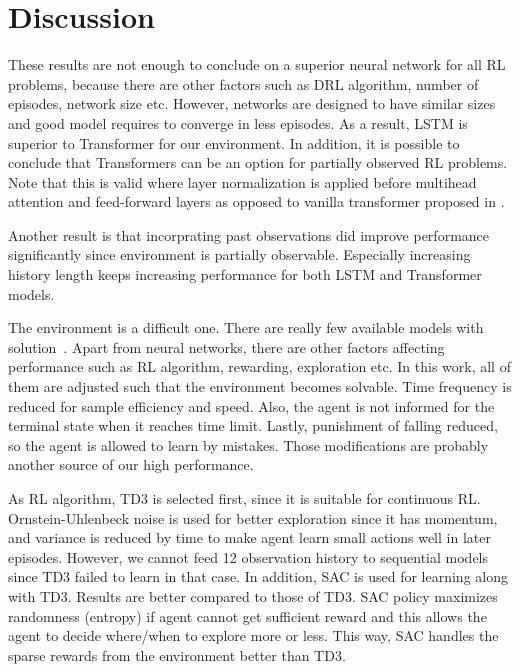 \section{Discussion}
These results are not enough to conclude on a superior neural network for all RL problems, because there are other factors such as DRL algorithm, number of episodes, network size etc. 
However, networks are designed to have similar sizes and good model requires to converge in less episodes. 
As a result, LSTM is superior to Transformer for our environment. 
In addition, it is possible to conclude that Transformers can be an option for partially observed RL problems.
Note that this is valid where layer normalization is applied before multihead attention and feed-forward layers \cite{xiong_layer_2020} as opposed to vanilla transformer proposed in \cite{vaswani_attention_2017}. 

Another result is that incorprating past observations did improve performance significantly since environment is partially observable.
Especially increasing history length keeps increasing performance for both LSTM and Transformer models. 

The environment is a difficult one. 
There are really few available models with solution~\cite{noauthor_gymleaderboard_2021}. 
Apart from neural networks, there are other factors affecting performance such as RL algorithm, rewarding, exploration etc. 
In this work, all of them are adjusted such that the environment becomes solvable. 
Time frequency is reduced for sample efficiency and speed. 
Also, the agent is not informed for the terminal state when it reaches time limit. 
Lastly, punishment of falling reduced, so the agent is allowed to learn by mistakes. 
Those modifications are probably another source of our high performance. 

As RL algorithm, TD3 is selected first, since it is suitable for continuous RL. 
Ornstein-Uhlenbeck noise is used for better exploration since it has momentum, and variance is reduced by time to make agent learn small actions well in later episodes. 
However, we cannot feed 12 observation history to sequential models since TD3 failed to learn in that case.
In addition, SAC is used for learning along with TD3. 
Results are better compared to those of TD3. 
SAC policy maximizes randomness (entropy) if agent cannot get sufficient reward and this allows the agent to decide where/when to explore more or less. 
This way, SAC handles the sparse rewards from the environment better than TD3. 
